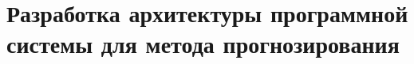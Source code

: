 \linespread{1.19}\selectfont

\chapter{Разработка архитектуры программной системы для метода прогнозирования}
